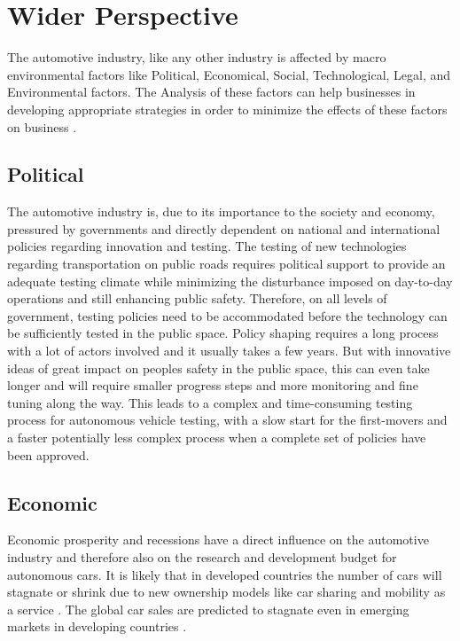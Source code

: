 \documentclass[a4paper]{article}
\begin{document}
\section{Wider Perspective}
\label{sec:selecting}

The automotive industry, like any other industry is affected by macro environmental factors like Political, Economical, Social, Technological, Legal, and Environmental factors. The Analysis of these factors can help businesses in developing appropriate strategies in order to minimize the effects of these factors on business \cite{CAMPBELL2005123}.

\subsection{Political}
\label{sec:political}
The automotive industry is, due to its importance to the society and economy, pressured by governments and directly dependent on national and international policies regarding innovation and testing. The testing of new technologies regarding transportation on public roads requires political support to provide an adequate testing climate while minimizing the disturbance imposed on day-to-day operations and still enhancing public safety. Therefore, on all levels of government, testing policies need to be accommodated before the technology can be sufficiently tested in the public space. Policy shaping requires a long process with a lot of actors involved and it usually takes a few years. But with innovative ideas of great impact on peoples safety in the public space, this can even take longer and will require smaller progress steps and more monitoring and fine tuning along the way. This leads to a complex and time-consuming testing process for autonomous vehicle testing, with a slow start for the first-movers and a faster potentially less complex process when a complete set of policies have been approved.

\subsection{Economic}
\label{sec:economic}
Economic prosperity and recessions have a direct influence on the automotive industry and therefore also on the research and development budget for autonomous cars. It is likely that in developed countries the number of cars will stagnate or shrink due to new ownership models like car sharing and mobility as a service \cite{Sivak2008}. The global car sales are predicted to stagnate even in emerging markets in developing countries \cite{Sivak2008}.
\end{document}
